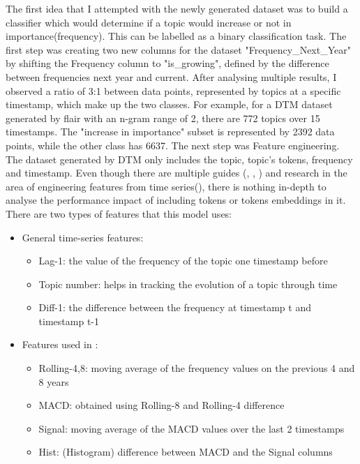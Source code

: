 \documentclass[12pt,MSc,a4paper,oneside]{muthesis}
\begin{document}
    The first idea that I attempted with the newly generated dataset was to build a classifier which would determine if a topic would increase or not in importance(frequency). This can be labelled as a binary classification task. The first step was creating two new columns for the dataset "Frequency\_Next\_Year" by shifting the Frequency column to "is\_growing", defined by the difference between frequencies next year and current. After analysing multiple results, I observed a ratio of 3:1 between data points, represented by topics at a specific timestamp, which make up the two classes. For example, for a DTM dataset generated by flair with an n-gram range of 2, there are 772 topics over 15 timestamps. The "increase in importance" subset is represented by 2392 data points, while the other class has 6637.
    The next step was Feature engineering. The dataset generated by DTM only includes the topic, topic's tokens, frequency and timestamp. Even though there are multiple guides (\cite{basic-fea-timeseries}, \cite{fea-timeseries}, \cite{a-guide-to-feature-engineering-time-series-tsfresh}) and research in the area of engineering features from time series(\cite{Tang2020EnrichingFE}), there is nothing in-depth to analyse the performance impact of including tokens or tokens embeddings in it. There are two types of features that this model uses:
    \begin{itemize}
      \item General time-series features:
        \begin{itemize}
          \item Lag-1: the value of the frequency of the topic one timestamp before
          \item Topic number: helps in tracking the evolution of a topic through time
          \item Diff-1: the difference between the frequency at timestamp t and timestamp t-1
        \end{itemize}
      \item Features used in \cite{Tattershall2019DetectingBT}:
        \begin{itemize}
          \item Rolling-4,8: moving average of the frequency values on the previous 4 and 8 years
          \item MACD: obtained using Rolling-8 and Rolling-4 difference
          \item Signal: moving average of the MACD values over the last 2 timestamps
          \item Hist: (Histogram) difference between MACD and the Signal columns
        \end{itemize}
    \end{itemize}
\end{document}
